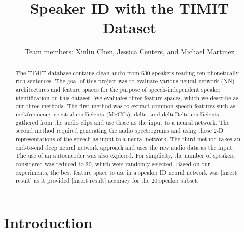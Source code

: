 \documentclass{article}
\title{Speaker ID with the TIMIT Dataset}
\author{
  Team members: Xinlin Chen, Jessica Centers, and Michael Martinez 
}
\begin{document}
\maketitle
\section*{}
\begin{abstract}
The TIMIT database contains clean audio from 630 speakers reading ten phonetically rich sentences. 
The goal of this project was to evaluate various neural network (NN) architectures and feature spaces for the purpose of speech-independent speaker identification on this dataset. 
We evaluates three feature spaces, which we describe as our three methods. 
The first method was to extract common speech features such as mel-frequency cepstral coefficients (MFCCs), delta, and deltaDelta coefficients gathered from the audio clips and use those as the input to a neural network. 
The second method required generating the audio spectrograms and using those 2-D representations of the speech as input to a neural network. 
The third method takes an end-to-end deep neural network approach and uses the raw audio data as the input. 
The use of an autoencoder was also explored. 
For simplicity, the number of speakers considered was reduced to 20, which were randomly selected. 
Based on our experiments, the best feature space to use in a speaker ID neural network was [insert result] as it provided [insert result] accuracy for the 20 speaker subset. 
\end{abstract}
\newpage

\section{Introduction}
\end{document}
